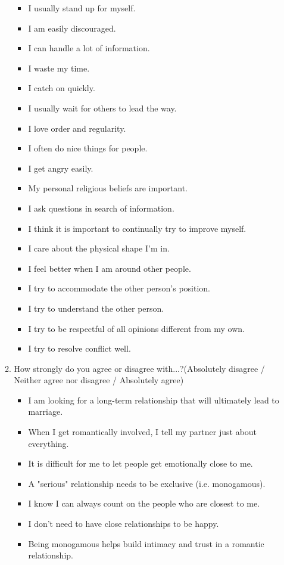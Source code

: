 \begin{appendices}
\begin{itemize}
\begin{enumerate}
\begin{itemize}
				\item I usually stand up for myself.
				\item I am easily discouraged.
				\item I can handle a lot of information.
				\item I waste my time.
				\item I catch on quickly.
				\item I usually wait for others to lead the way.
				\item I love order and regularity.
				\item I often do nice things for people.
				\item I get angry easily.
				\item My personal religious beliefs are important.
				\item I ask questions in search of information.
				\item I think it is important to continually try to improve myself.
				\item I care about the physical shape I'm in.
				\item I feel better when I am around other people.
				\item I try to accommodate the other person's position.
				\item I try to understand the other person.
				\item I try to be respectful of all opinions different from my own.
				\item I try to resolve conflict well.
			\end{itemize}
			\item How strongly do you agree or disagree with...?(Absolutely disagree / Neither agree nor disagree / Absolutely agree)
			\begin{itemize}
				\item I am looking for a long-term relationship that will ultimately lead to marriage.
				\item When I get romantically involved, I tell my partner just about everything.
				\item It is difficult for me to let people get emotionally close to me.
				\item A "serious" relationship needs to be exclusive (i.e. monogamous).
				\item I know I can always count on the people who are closest to me.
				\item I don't need to have close relationships to be happy.
				\item Being monogamous helps build intimacy and trust in a romantic relationship.

\end{itemize}
\end{enumerate}
\end{itemize}
\end{appendices}
